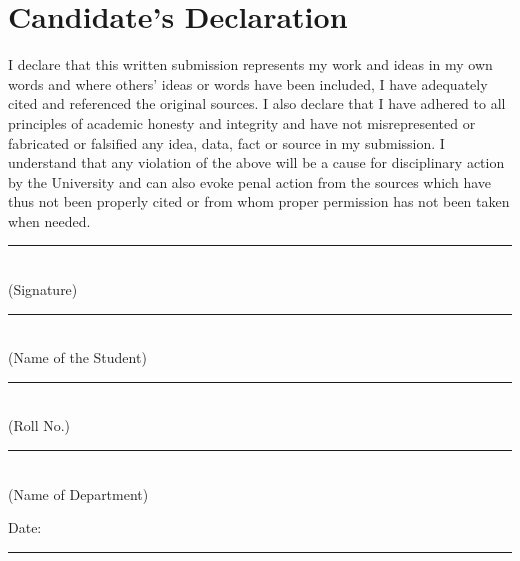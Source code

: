\chapter*{Candidate's Declaration}
\thispagestyle{plain}

I declare that this written submission represents my work and ideas in my own
words and where others' ideas or words have been included, I have adequately
cited and referenced the original sources. I also declare that I have adhered to
all principles of academic honesty and integrity and have not misrepresented or
fabricated or falsified any idea, data, fact or source in my submission. I
understand that any violation of the above will be a cause for disciplinary
action by the University and can also evoke penal action from the sources which
have thus not been properly cited or from whom proper permission has not been
taken when needed.

\vspace{2.2cm}
\noindent\rule{7cm}{0.4pt}\\
(Signature)

\vspace{0.8cm}
\noindent\rule{7cm}{0.4pt}\\
(Name of the Student)

\vspace{0.8cm}
\noindent\rule{7cm}{0.4pt}\\
(Roll No.)

\vspace{0.8cm}
\noindent\rule{7cm}{0.4pt}\\
(Name of Department)

\vspace{1.2cm}
\noindent Date: \rule{4cm}{0.4pt}

\clearpage
